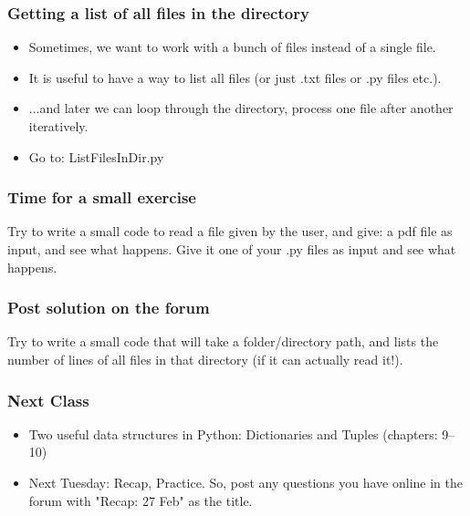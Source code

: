 \documentclass{beamer}
\begin{document}
\begin{frame}[fragile]
\frametitle{Getting a list of all files in the directory}
\begin{itemize}
\item Sometimes, we want to work with a bunch of files instead of a single file. 
\item It is useful to have a way to list all files (or just .txt files or .py files etc.).
\item ...and later we can loop through the directory, process one file after another iteratively.
\item Go to: ListFilesInDir.py
\end{itemize}
\end{frame}

\begin{frame}
\frametitle{Time for a small exercise}
Try to write a small code to read a file given by the user, and give: a pdf file as input, and see what happens. Give it one of your .py files as input and see what happens.
\end{frame}

\begin{frame}
\frametitle{Post solution on the forum}
Try to write a small code that will take a folder/directory path, and lists the number of lines of all files in that directory (if it can actually read it!).
\end{frame}

\begin{frame}
\frametitle{Next Class}
\begin{itemize}
\item Two useful data structures in Python: Dictionaries and Tuples (chapters: 9--10)
\item Next Tuesday: Recap, Practice. So, post any questions you have online in the forum with "Recap: 27 Feb" as the title.
\end{itemize}
\end{frame}
\end{document}
